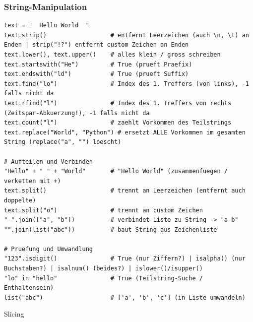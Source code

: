 \subsubsection{String-Manipulation}\label{sec:01-string-methoden-referenz}
\begin{codebox}
\begin{lstlisting}[style=CodeExpert]
text = "  Hello World  "
text.strip()                  # entfernt Leerzeichen (auch \n, \t) an Enden | strip("!?") entfernt custom Zeichen an Enden
text.lower(), text.upper()    # alles klein / gross schreiben
text.startswith("He")         # True (prueft Praefix)
text.endswith("ld")           # True (prueft Suffix)
text.find("lo")               # Index des 1. Treffers (von links), -1 falls nicht da
text.rfind("l")               # Index des 1. Treffers von rechts (Zeitspar-Abkuerzung!), -1 falls nicht da
text.count("l")               # zaehlt Vorkommen des Teilstrings
text.replace("World", "Python") # ersetzt ALLE Vorkommen im gesamten String (replace("a", "") loescht)

# Aufteilen und Verbinden
"Hello" + " " + "World"       # "Hello World" (zusammenfuegen / verketten mit +)
text.split()                  # trennt an Leerzeichen (entfernt auch doppelte)
text.split("o")               # trennt an custom Zeichen
"-".join(["a", "b"])          # verbindet Liste zu String -> "a-b"
"".join(list("abc"))          # baut String aus Zeichenliste

# Pruefung und Umwandlung
"123".isdigit()               # True (nur Ziffern?) | isalpha() (nur Buchstaben?) | isalnum() (beides?) | islower()/isupper()
"lo" in "hello"               # True (Teilstring-Suche / Enthaltensein)
list("abc")                   # ['a', 'b', 'c'] (in Liste umwandeln)
\end{lstlisting}
Slicing 
\end{codebox}
